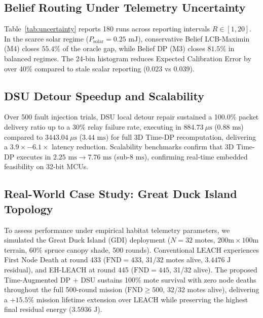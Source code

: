 \documentclass[conference]{IEEEtran}
\begin{document}
\subsection{Belief Routing Under Telemetry Uncertainty}
Table~\ref{tab:uncertainty} reports 180 runs across reporting intervals $R \in [1, 20]$. In the scarce solar regime ($P_{\text{solar}} = 0.25\text{ mJ}$), conservative Belief LCB-Maximin (M4) closes $55.4\%$ of the oracle gap, while Belief DP (M3) closes $81.5\%$ in balanced regimes. The 24-bin histogram reduces Expected Calibration Error by over $40\%$ compared to stale scalar reporting ($0.023$ vs $0.039$).

\subsection{DSU Detour Speedup and Scalability}
Over 500 fault injection trials, DSU local detour repair sustained a 100.0\% packet delivery ratio up to a 30\% relay failure rate, executing in $884.73\ \mu\text{s}$ ($0.88\text{ ms}$) compared to $3443.04\ \mu\text{s}$ ($3.44\text{ ms}$) for full 3D Time-DP recomputation, delivering a $3.9\times - 6.1\times$ latency reduction. Scalability benchmarks confirm that 3D Time-DP executes in $2.25\text{ ms} \to 7.76\text{ ms}$ (sub-$8\text{ ms}$), confirming real-time embedded feasibility on 32-bit MCUs.

\subsection{Real-World Case Study: Great Duck Island Topology}
To assess performance under empirical habitat telemetry parameters, we simulated the Great Duck Island (GDI) deployment ($N=32$ motes, $200\text{m} \times 100\text{m}$ terrain, 60\% spruce canopy shade, 500 rounds). Conventional LEACH experiences First Node Death at round 433 ($\text{FND}=433$, 31/32 motes alive, $3.4476\text{ J}$ residual), and EH-LEACH at round 445 ($\text{FND}=445$, 31/32 alive). The proposed Time-Augmented DP + DSU sustains 100\% mote survival with zero node deaths throughout the full 500-round mission ($\text{FND} \ge 500$, 32/32 motes alive), delivering a $+15.5\%$ mission lifetime extension over LEACH while preserving the highest final residual energy ($3.5936\text{ J}$).
\end{document}
